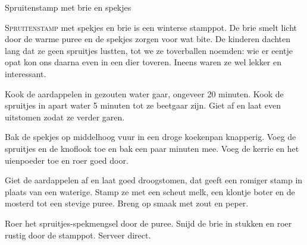 \begin{recipe}{Spruitenstamp met brie en spekjes}


\lettrine{S}{pruitenstamp} met spekjes en brie is een winterse stamppot. De brie
smelt licht door de warme puree en de spekjes zorgen voor wat bite. De
kinderen dachten lang dat ze geen spruitjes lustten, tot we ze
toverballen noemden: wie er eentje opat kon ons daarna even in een dier
toveren. Ineens waren ze wel lekker en interessant.

\begin{ingredients}
\end{ingredients}

\begin{steps}
  \item Kook de aardappelen in gezouten water gaar, ongeveer 20 minuten. Kook de spruitjes in apart water 5 minuten tot ze beetgaar zijn. Giet af en
        laat even uitstomen zodat ze verder garen.
  \item Bak de spekjes op middelhoog vuur in een droge koekenpan knapperig. Voeg de spruitjes en de
        knoflook toe en bak een paar minuten mee. Voeg de kerrie en het uienpoeder
        toe en roer goed door.
  \item Giet de aardappelen af en laat goed droogstomen, dat geeft een romiger
        stamp in plaats van een waterige. Stamp ze met een scheut melk,
        een klontje boter en de mosterd tot een stevige puree. Breng op smaak met zout en peper.
  \item Roer het spruitjes-spekmengsel door de puree. Snijd de brie in stukken en roer rustig door de stamppot. Serveer direct.
\end{steps}
\end{recipe}
